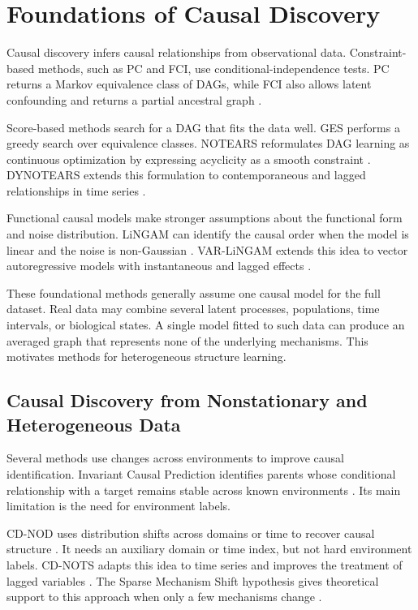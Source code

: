\section{Foundations of Causal Discovery}
\label{sec:foundations}

Causal discovery infers causal relationships from observational data. Constraint-based
methods, such as PC and FCI, use conditional-independence tests. PC returns a
Markov equivalence class of DAGs, while FCI also allows latent confounding and
returns a partial ancestral graph \cite{spirtes2000causation}.

Score-based methods search for a DAG that fits the data well. GES performs a greedy
search over equivalence classes. NOTEARS reformulates DAG learning as continuous
optimization by expressing acyclicity as a smooth constraint
\cite{zheng2018dags}. DYNOTEARS extends this formulation to contemporaneous and
lagged relationships in time series \cite{pamfil2020dynotears}.

Functional causal models make stronger assumptions about the functional form and
noise distribution. LiNGAM can identify the causal order when the model is linear
and the noise is non-Gaussian \cite{shimizu2006lingam}. VAR-LiNGAM extends this
idea to vector autoregressive models with instantaneous and lagged effects
\cite{hyvarinen2010estimation}.

These foundational methods generally assume one causal model for the full dataset.
Real data may combine several latent processes, populations, time intervals, or
biological states. A single model fitted to such data can produce an averaged graph
that represents none of the underlying mechanisms. This motivates methods for
heterogeneous structure learning.

\subsection{Causal Discovery from Nonstationary and Heterogeneous Data}
\label{ssec:nonstationary}

Several methods use changes across environments to improve causal identification.
Invariant Causal Prediction identifies parents whose conditional relationship with a
target remains stable across known environments \cite{peters2016causal}. Its main
limitation is the need for environment labels.

CD-NOD uses distribution shifts across domains or time to recover causal structure
\cite{huang2020causal}. It needs an auxiliary domain or time index, but not hard
environment labels. CD-NOTS adapts this idea to time series and improves the
treatment of lagged variables \cite{sadeghi2025causal}. The Sparse Mechanism Shift
hypothesis gives theoretical support to this approach when only a few mechanisms
change \cite{perry2022causal}.

